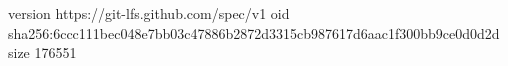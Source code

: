 version https://git-lfs.github.com/spec/v1
oid sha256:6ccc111bec048e7bb03c47886b2872d3315cb987617d6aac1f300bb9ce0d0d2d
size 176551
